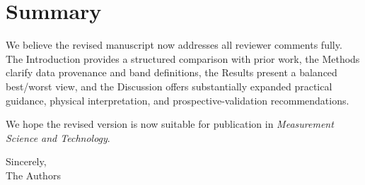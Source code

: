 \documentclass[10pt]{article}
\begin{document}
\begin{enumerate}[leftmargin=*, label=\textbf{Comment \arabic*.}, ref=\arabic*]
\end{enumerate}

\section*{Summary}

We believe the revised manuscript now addresses all reviewer comments fully. The Introduction provides a structured comparison with prior work, the Methods clarify data provenance and band definitions, the Results present a balanced best/worst view, and the Discussion offers substantially expanded practical guidance, physical interpretation, and prospective-validation recommendations.

We hope the revised version is now suitable for publication in \textit{Measurement Science and Technology}.

\vspace{4mm}
\noindent Sincerely,\\
The Authors
\end{document}
